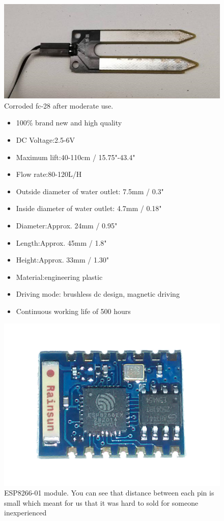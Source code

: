 \documentclass[a4paper,12pt,twoside,openright,titlepage]{book}
\begin{document}
\begin{figure}[!ht]
  \centering
      \includegraphics{fc-28-corrosion}
  \caption{Corroded fc-28 after moderate use.}
  \label{fig:resistive}
\end{figure}

\begin{figure}[ht!]
	\begin{itemize}
	\item 100\% brand new and high quality
	\item DC Voltage:2.5-6V
	\item Maximum lift:40-110cm / 15.75"-43.4"
	\item Flow rate:80-120L/H
	\item Outside diameter of water outlet: 7.5mm / 0.3"
	\item Inside diameter of water outlet: 4.7mm / 0.18"
	\item Diameter:Approx. 24mm / 0.95"
	\item Length:Approx. 45mm / 1.8"
	\item Height:Approx. 33mm / 1.30"
	\item Material:engineering plastic
	\item Driving mode: brushless dc design, magnetic driving
	\item Continuous working life of 500 hours
	\end{itemize}
	\label{fig:pump description}
\end{figure}


\begin{figure}[!ht]
	\centering
		\includegraphics[scale=0.20]{ESP-01}
	\caption{ESP8266-01 module. You can see that distance between each pin is small which meant for us that it was hard to sold for someone inexperienced}
	\label{fig:ESP}
\end{figure}
\end{document}
